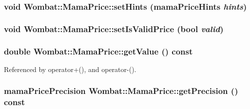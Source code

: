 \label{classWombat_1_1MamaPrice_ac9d788606dd5f6d5e27cd216a4d504d6}
\hypertarget{classWombat_1_1MamaPrice_afef7ffe99eefa0dec17ab47e10e67b34}{
\subsubsection[{setHints}]{\setlength{\rightskip}{0pt plus 5cm}void Wombat::MamaPrice::setHints (mamaPriceHints {\em hints})}}
\label{classWombat_1_1MamaPrice_afef7ffe99eefa0dec17ab47e10e67b34}
\hypertarget{classWombat_1_1MamaPrice_af246cbbcb60bc112a1e08c5a8d109971}{
\subsubsection[{setIsValidPrice}]{\setlength{\rightskip}{0pt plus 5cm}void Wombat::MamaPrice::setIsValidPrice (bool {\em valid})}}
\label{classWombat_1_1MamaPrice_af246cbbcb60bc112a1e08c5a8d109971}
\hypertarget{classWombat_1_1MamaPrice_a328a5ee5788f0083494185c8770f75d1}{
\subsubsection[{getValue}]{\setlength{\rightskip}{0pt plus 5cm}double Wombat::MamaPrice::getValue () const}}
\label{classWombat_1_1MamaPrice_a328a5ee5788f0083494185c8770f75d1}


Referenced by operator+(), and operator-\/().\hypertarget{classWombat_1_1MamaPrice_a59dd3030741d4b7d28ed6302883ada45}{
\subsubsection[{getPrecision}]{\setlength{\rightskip}{0pt plus 5cm}mamaPricePrecision Wombat::MamaPrice::getPrecision () const}}
\label{classWombat_1_1MamaPrice_a59dd3030741d4b7d28ed6302883ada45}


